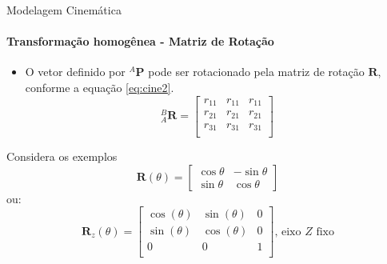 \documentclass{beamer}
\begin{document}
\begin{frame}{Modelagem Cinemática}
    \framesubtitle{Transformação homogênea - Matriz de Rotação}
  \begin{itemize}
    \item O vetor definido por ${}^A\mathbf{P}$ pode ser rotacionado pela matriz de rotação $\mathbf{R}$, conforme a equação \eqref{eq:cine2}.
    \begin{equation}\label{eq:cine2}
        {}_A^B
        \mathbf{R} = 
        \begin{bmatrix}
        r_{11} & r_{11} & r_{11}\\
        r_{21} & r_{21} & r_{21}\\
        r_{31} & r_{31} & r_{31}\\
        \end{bmatrix}
        \end{equation}
\end{itemize}

\begin{block}{Considera os exemplos}
    \begin{equation*}
        \mathbf{R}(\theta) = 
        \begin{bmatrix}
            \cos \theta &-\sin \theta \\\sin \theta &\cos \theta
        \end{bmatrix}
        \end{equation*}
    ou:
    \begin{equation*}
        \mathbf{R}_z(\theta) = 
        \begin{bmatrix}
        \cos(\theta) & \sin(\theta) & 0\\
        \sin(\theta) & \cos(\theta) & 0\\
        0 & 0 & 1\\ 
        \end{bmatrix} \text{, eixo $Z$ fixo}
        \end{equation*}
\end{block}

\end{frame}
\end{document}
